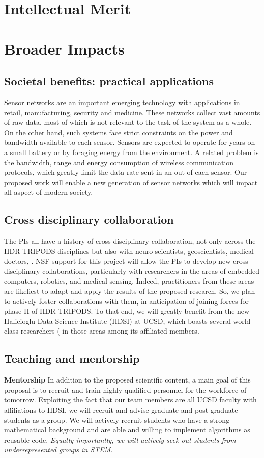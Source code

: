 \documentclass{article}
\begin{document}
\section{Intellectual Merit}

\section{Broader Impacts}
\subsection*{Societal benefits: practical applications}
Sensor networks are an important emerging technology with applications
in retail, manufacturing, security and medicine. These networks
collect vast amounts of raw data, most of which is not relevant to the
task of the system as a whole. On the other hand, such systems face strict constraints on the power and bandwidth available to each sensor.
Sensors are expected to operate for years on a small battery or by
foraging energy from the environment. A related problem is the
bandwidth, range and energy consumption of wireless communication
protocols, which greatly limit the data-rate sent in an out of each
sensor. Our proposed work
will enable a new generation of sensor networks which will impact all
aspect of modern society.
\subsection*{Cross disciplinary collaboration}
The PIs all have a history of cross disciplinary collaboration, not only across the HDR TRIPODS disciplines but also with neuro-scientists, geoscientists, medical doctors, . NSF support for this project will allow the PIs to develop new cross-disciplinary collaborations, particularly with researchers in the areas of embedded computers, robotics, and medical sensing. Indeed, practitioners from these areas are likeliest to adapt and apply the results of the proposed research. So, we plan to actively foster collaborations with them, in anticipation of joining forces for phase II of HDR TRIPODS. To that end, we will greatly benefit from the new Halicioglu Data Science Institute (HDSI) at UCSD, which boasts several world class researchers ( in those areas among its affiliated members. 
\subsection*{Teaching and mentorship}
{\bf Mentorship} In addition to the proposed scientific content, a main goal of this proposal is to recruit and train highly qualified personnel for the workforce of tomorrow. Exploiting the fact that our team members are all UCSD faculty with affiliations to HDSI, we will recruit and advise graduate and post-graduate students as a
group. We will actively recruit students who have a strong
mathematical background and are able and willing to implement
algorithms as reusable code. \emph{Equally importantly, we will actively seek out students from underrepresented groups in STEM.}
\end{document}
